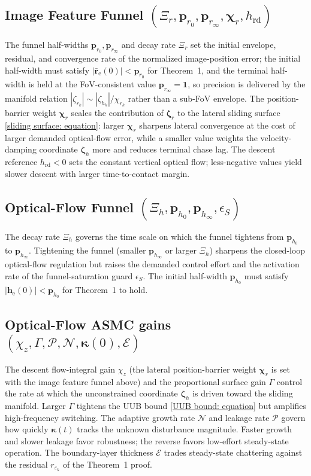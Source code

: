 \documentclass{IEEEtaes}
\begin{document}
\subsection{Image Feature Funnel $(\Xi_r, \boldsymbol{p}_{r_0}, \boldsymbol{p}_{r_\infty}, \boldsymbol{\chi}_r, h_\text{rd})$} The funnel half-widths $\boldsymbol{p}_{r_0}, \boldsymbol{p}_{r_\infty}$ and decay rate $\Xi_r$ set the initial envelope, residual, and convergence rate of the normalized image-position error; the initial half-width must satisfy $|\bar{\boldsymbol{r}}_\text{e}(0)|<\boldsymbol{p}_{r_0}$ for Theorem~1, and the terminal half-width is held at the FoV-consistent value $\boldsymbol{p}_{r_\infty}=\boldsymbol{1}$, so precision is delivered by the manifold relation $|\zeta_{r_k}|\sim|\zeta_{h_k}|/\chi_{r_k}$ rather than a sub-FoV envelope. The position-barrier weight $\boldsymbol{\chi}_r$ scales the contribution of $\boldsymbol{\zeta}_r$ to the lateral sliding surface \eqref{sliding surface: equation}: larger $\boldsymbol{\chi}_r$ sharpens lateral convergence at the cost of larger demanded optical-flow error, while a smaller value weights the velocity-damping coordinate $\boldsymbol{\zeta}_h$ more and reduces terminal chase lag. The descent reference $h_\text{rd}<0$ sets the constant vertical optical flow; less-negative values yield slower descent with larger time-to-contact margin.

\subsection{Optical-Flow Funnel $(\Xi_h, \boldsymbol{p}_{h_0}, \boldsymbol{p}_{h_\infty}, \epsilon_S)$} The decay rate $\Xi_h$ governs the time scale on which the funnel tightens from $\boldsymbol{p}_{h_0}$ to $\boldsymbol{p}_{h_\infty}$. Tightening the funnel (smaller $\boldsymbol{p}_{h_\infty}$ or larger $\Xi_h$) sharpens the closed-loop optical-flow regulation but raises the demanded control effort and the activation rate of the funnel-saturation guard $\epsilon_S$. The initial half-width $\boldsymbol{p}_{h_0}$ must satisfy $|\boldsymbol{h}_\text{e}(0)|<\boldsymbol{p}_{h_0}$ for Theorem~1 to hold.

\subsection{Optical-Flow ASMC gains $(\chi_z, \Gamma, \mathcal{P}, \mathcal{N}, \boldsymbol{\kappa}(0), \mathcal{E})$} The descent flow-integral gain $\chi_z$ (the lateral position-barrier weight $\boldsymbol{\chi}_r$ is set with the image feature funnel above) and the proportional surface gain $\Gamma$ control the rate at which the unconstrained coordinate $\boldsymbol{\zeta}_h$ is driven toward the sliding manifold. Larger $\Gamma$ tightens the UUB bound \eqref{UUB bound: equation} but amplifies high-frequency switching. The adaptive growth rate $\mathcal{N}$ and leakage rate $\mathcal{P}$ govern how quickly $\boldsymbol{\kappa}(t)$ tracks the unknown disturbance magnitude. Faster growth and slower leakage favor robustness; the reverse favors low-effort steady-state operation. The boundary-layer thickness $\mathcal{E}$ trades steady-state chattering against the residual $r_{\varepsilon_k}$ of the Theorem~1 proof.
\end{document}

